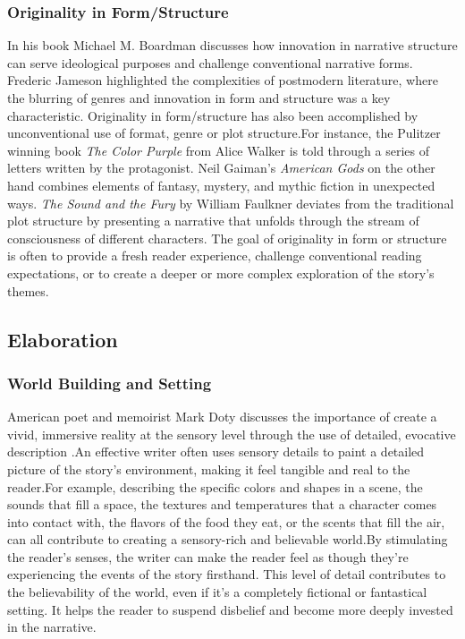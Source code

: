 \subsubsection{Originality in Form/Structure}
In his book \cite{boardman1992narrative} Michael M. Boardman discusses how innovation in narrative structure can serve ideological purposes and challenge conventional narrative forms. Frederic Jameson  highlighted the complexities of postmodern literature, where the blurring of genres and innovation in form and structure was a key characteristic\cite{jameson1991postmodernism}. Originality in form/structure has also been accomplished by unconventional use of format, genre or plot structure.For instance, the Pulitzer winning book \textit{The Color Purple} from Alice Walker is told through a series of letters written by the protagonist. Neil Gaiman's \textit{American Gods} on the other hand combines elements of fantasy, mystery, and mythic fiction in unexpected ways. \textit{The Sound and the Fury} by William Faulkner deviates from the traditional plot structure by presenting a narrative that unfolds through the stream of consciousness of different characters. The goal of originality in form or structure is often to provide a fresh reader experience, challenge conventional reading expectations, or to create a deeper or more complex exploration of the story's themes.
\subsection{Elaboration}
\subsubsection{World Building and Setting}
American poet and memoirist Mark Doty discusses the importance of create a vivid, immersive reality at the sensory level through the use of detailed, evocative description \cite{doty2014art84794531}.An effective writer often uses sensory details to paint a detailed picture of the story's environment, making it feel tangible and real to the reader.For example, describing the specific colors and shapes in a scene, the sounds that fill a space, the textures and temperatures that a character comes into contact with, the flavors of the food they eat, or the scents that fill the air, can all contribute to creating a sensory-rich and believable world.By stimulating the reader's senses, the writer can make the reader feel as though they're experiencing the events of the story firsthand. This level of detail contributes to the believability of the world, even if it's a completely fictional or fantastical setting. It helps the reader to suspend disbelief and become more deeply invested in the narrative.

